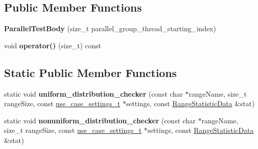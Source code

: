 \subsection*{Public Member Functions}
\begin{DoxyCompactItemize}
\item 
\hypertarget{classuniform__iterations__distribution_1_1ParallelTestBody_ac25ec90ba377a689a01d9c6a237fd039}{}{\bfseries Parallel\+Test\+Body} (size\+\_\+t parallel\+\_\+group\+\_\+thread\+\_\+starting\+\_\+index)\label{classuniform__iterations__distribution_1_1ParallelTestBody_ac25ec90ba377a689a01d9c6a237fd039}

\item 
\hypertarget{classuniform__iterations__distribution_1_1ParallelTestBody_a2a0d0177ab7219cfef372f56e537d843}{}void {\bfseries operator()} (size\+\_\+t) const \label{classuniform__iterations__distribution_1_1ParallelTestBody_a2a0d0177ab7219cfef372f56e537d843}

\end{DoxyCompactItemize}
\subsection*{Static Public Member Functions}
\begin{DoxyCompactItemize}
\item 
\hypertarget{classuniform__iterations__distribution_1_1ParallelTestBody_a34ca48615f37acc74a834dfe4d5d9a7f}{}static void {\bfseries uniform\+\_\+distribution\+\_\+checker} (const char $\ast$range\+Name, size\+\_\+t range\+Size, const \hyperlink{structuniform__iterations__distribution_1_1ParallelTestBody_1_1use__case__settings__t}{use\+\_\+case\+\_\+settings\+\_\+t} $\ast$settings, const \hyperlink{structtest__partitioner__utils_1_1RangeStatisticData}{Range\+Statistic\+Data} \&stat)\label{classuniform__iterations__distribution_1_1ParallelTestBody_a34ca48615f37acc74a834dfe4d5d9a7f}

\item 
\hypertarget{classuniform__iterations__distribution_1_1ParallelTestBody_a660d88ff72f74651c09f4fa7119e23d8}{}static void {\bfseries nonuniform\+\_\+distribution\+\_\+checker} (const char $\ast$range\+Name, size\+\_\+t range\+Size, const \hyperlink{structuniform__iterations__distribution_1_1ParallelTestBody_1_1use__case__settings__t}{use\+\_\+case\+\_\+settings\+\_\+t} $\ast$settings, const \hyperlink{structtest__partitioner__utils_1_1RangeStatisticData}{Range\+Statistic\+Data} \&stat)\label{classuniform__iterations__distribution_1_1ParallelTestBody_a660d88ff72f74651c09f4fa7119e23d8}

\end{DoxyCompactItemize}
